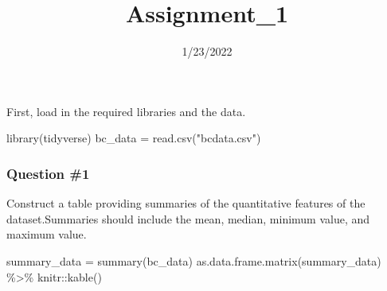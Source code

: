 \documentclass[
]{article}
\title{Assignment\_1}
\author{}
\date{\vspace{-2.5em}1/23/2022}
\newenvironment{Shaded}{\begin{snugshade}}{\end{snugshade}}
\newcommand{\FunctionTok}[1]{\textcolor[rgb]{0.00,0.00,0.00}{#1}}
\newcommand{\NormalTok}[1]{#1}
\newcommand{\OtherTok}[1]{\textcolor[rgb]{0.56,0.35,0.01}{#1}}
\newcommand{\SpecialCharTok}[1]{\textcolor[rgb]{0.00,0.00,0.00}{#1}}
\newcommand{\StringTok}[1]{\textcolor[rgb]{0.31,0.60,0.02}{#1}}
\begin{document}
\maketitle

First, load in the required libraries and the data.

\begin{Shaded}
\begin{Highlighting}[]
\FunctionTok{library}\NormalTok{(tidyverse)}
\NormalTok{bc\_data }\OtherTok{=} \FunctionTok{read.csv}\NormalTok{(}\StringTok{"bcdata.csv"}\NormalTok{)}
\end{Highlighting}
\end{Shaded}

\hypertarget{question-1}{%
\subsubsection{Question \#1}\label{question-1}}

Construct a table providing summaries of the quantitative features of
the dataset.Summaries should include the mean, median, minimum value,
and maximum value.

\begin{Shaded}
\begin{Highlighting}[]
\NormalTok{summary\_data }\OtherTok{=} \FunctionTok{summary}\NormalTok{(bc\_data)}
\FunctionTok{as.data.frame.matrix}\NormalTok{(summary\_data) }\SpecialCharTok{\%\textgreater{}\%} 
\NormalTok{  knitr}\SpecialCharTok{::}\FunctionTok{kable}\NormalTok{()}
\end{Highlighting}
\end{Shaded}
\end{document}
